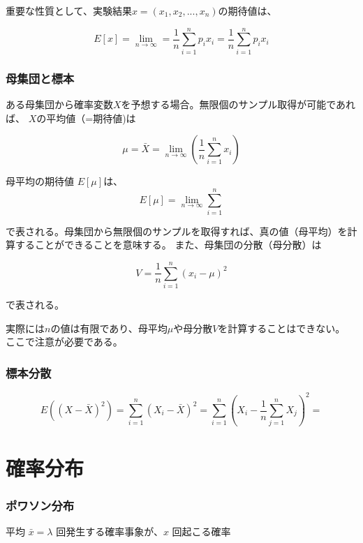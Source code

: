 \documentclass[uplatex]{jsarticle}
\begin{document}
重要な性質として、実験結果$x=(x_1,x_2,...,x_n)$の期待値は、

\begin{equation}
  E[x] = \lim_{n\to\infty} = \frac{1}{n}\sum_{i=1}^{n} p_ix_i = \frac{1}{n}\sum_{i=1}^{n} p_ix_i
\end{equation}



\subsubsection{母集団と標本}
ある母集団から確率変数$X$を予想する場合。無限個のサンプル取得が可能であれば、 $X$の平均値（=期待値)は

\begin{equation}
  \mu = \bar{X} = \lim_{n\to\infty} \left(\frac{1}{n} \sum_{i=1}^{n} x_i \right)
\end{equation}

母平均の期待値 $E[\mu]$は、
\begin{equation}
  E[\mu] = \lim_{n\to\infty}\sum_{i=1}^{n}
\end{equation}

で表される。母集団から無限個のサンプルを取得すれば、真の値（母平均）を計算することができることを意味する。
また、母集団の分散（母分散）は

\begin{equation}
  V= \frac{1}{n}\sum_{i=1}^{n} (x_{i}-\mu)^{2}
\end{equation}

で表される。

実際には$n$の値は有限であり、母平均$\mu$や母分散$V$を計算することはできない。
ここで注意が必要である。
\subsubsection{標本分散}
\begin{equation}
  E((X-\bar{X})^2) = \sum_{i=1}^{n} (X_i - \bar{X})^2 = \sum_{i=1}^{n} \left(X_i - \frac{1}{n}\sum_{j=1}^{n} X_j \right)^2
  =
\end{equation}

\section{確率分布}
\subsubsection{ポワソン分布}
\label{subsubsec:poisson}
平均 $\bar{x}=\lambda$ 回発生する確率事象が、$x$ 回起こる確率
\end{document}
